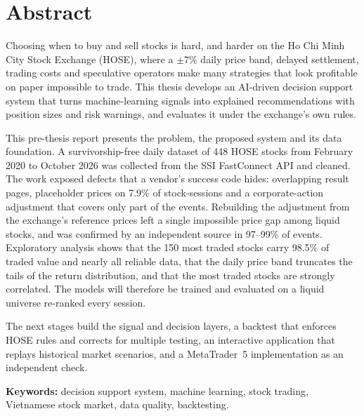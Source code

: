 \chapter*{Abstract}

Choosing when to buy and sell stocks is hard, and harder on the Ho Chi Minh City Stock Exchange
(HOSE), where a $\pm7\%$ daily price band, delayed settlement, trading costs and speculative
operators make many strategies that look profitable on paper impossible to trade. This thesis
develops an AI-driven decision support system that turns machine-learning signals into explained
recommendations with position sizes and risk warnings, and evaluates it under the exchange's own
rules.

This pre-thesis report presents the problem, the proposed system and its data foundation. A
survivorship-free daily dataset of 448 HOSE stocks from February 2020 to October 2026 was
collected from the SSI FastConnect API and cleaned. The work exposed defects that a vendor's
success code hides: overlapping result pages, placeholder prices on 7.9\% of stock-sessions and a
corporate-action adjustment that covers only part of the events. Rebuilding the adjustment from
the exchange's reference prices left a single impossible price gap among liquid stocks, and was
confirmed by an independent source in 97--99\% of events. Exploratory analysis shows that the
150 most traded stocks carry 98.5\% of traded value and nearly all reliable data, that the daily
price band truncates the tails of the return distribution, and that the most traded stocks are
strongly correlated. The models will therefore be trained and evaluated on a liquid universe
re-ranked every session.

The next stages build the signal and decision layers, a backtest that enforces HOSE rules and
corrects for multiple testing, an interactive application that replays historical market
scenarios, and a MetaTrader~5 implementation as an independent check.

\bigskip
\noindent\textbf{Keywords:} decision support system, machine learning, stock trading,
Vietnamese stock market, data quality, backtesting.

